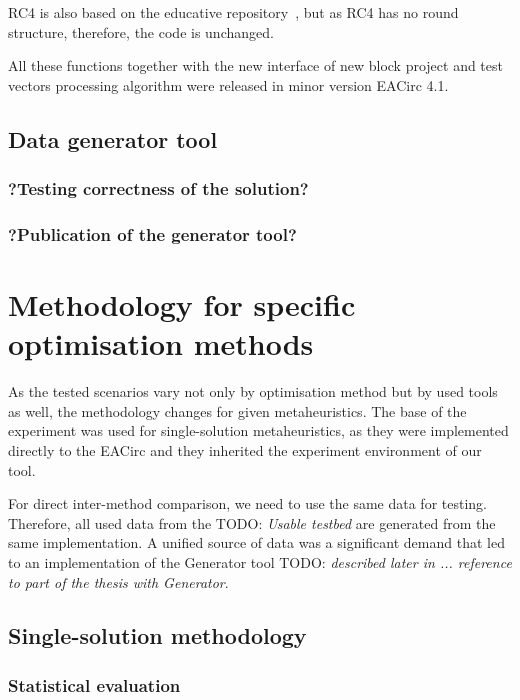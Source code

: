 \documentclass[
  print, %
  Table,   %
  nolof,     %
  nolot,     %
  11pt, %
  oneside  %
]{fithesis3}
\newcommand{\todo}[1]{TODO: \textit{#1}}
\begin{document}
RC4 is also based on the educative repository~\cite{cryptoFunc}, but as RC4 has no round structure, therefore, the code is unchanged.

All these functions together with the new interface of new block project and test vectors processing algorithm were released in minor version EACirc 4.1.


\subsection{Data generator tool}
\label{subsec:method-data-generator}


\subsubsection{?Testing correctness of the solution?}
\subsubsection{?Publication of the generator tool?}


\section{Methodology for specific optimisation methods}
\label{sec:method-spec}

As the tested scenarios vary not only by optimisation method but by used tools as well, the methodology changes for given metaheuristics. The base of the experiment was used for single-solution metaheuristics, as they were implemented directly to the EACirc and they inherited the experiment environment of our tool.

For direct inter-method comparison, we need to use the same data for testing. Therefore, all used data from the \todo{Usable testbed} are generated from the same implementation. A unified source of data was a significant demand that led to an implementation of the Generator tool \todo{described later in ... reference to part of the thesis with Generator}.

\subsection{Single-solution methodology}
\label{subsec:method-spec-ss}

\subsubsection{Statistical evaluation}
\label{subsubsec:method-spec-ss-stat}
\end{document}
